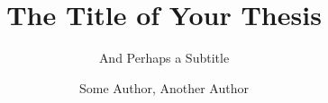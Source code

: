 \documentclass[a4paper,12pt,twoside]{chalmers-thesis}
\title{The Title of Your Thesis}
\subtitle{And Perhaps a Subtitle}
\author{Some Author, Another Author}
\begin{document}
\maketitle

\newpage
\mbox{}

\FloatBarrier
\FloatBarrier
% 
% 

{}


\end{document}
